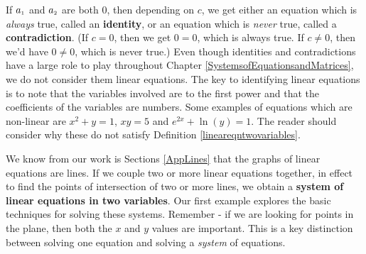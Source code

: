 \documentclass{ximera}
\begin{document}
If $a_{\mbox{\tiny$1$}}$ and $a_{\mbox{\tiny$2$}}$ are both $0$, then depending on $c$, we get either an equation which is \textit{always} true, called an \textbf{identity}, or an equation which is \textit{never} true, called a \textbf{contradiction}. (If $c = 0$, then we get $0 = 0$, which is always true.  If $c \neq 0$, then we'd have  $0 \neq 0$, which is never true.)  Even though identities and contradictions have a large role to play throughout Chapter \ref{SystemsofEquationsandMatrices}, we do not consider them linear equations.  The key to identifying linear equations is to note that the variables involved are to the first power and that the coefficients of the variables are numbers.  Some examples of equations which are non-linear are $x^2 + y = 1$, $xy = 5$ and $e^{2x} + \ln(y) = 1$.  The reader should consider why these do not satisfy Definition \ref{lineareqntwovariables}.  

\medskip

We know from our work is Sections \ref{AppLines} that the graphs of linear equations are lines.  If we couple two or more linear equations together, in effect to find the points of intersection of two or more lines, we obtain a \textbf{system of linear equations in two variables}.  Our first example explores the basic techniques for solving these systems.  Remember - if we are looking for points in the plane, then both the $x$ and $y$ values are important.  This is a key distinction between solving one equation and solving a \emph{system} of equations.
\end{document}
